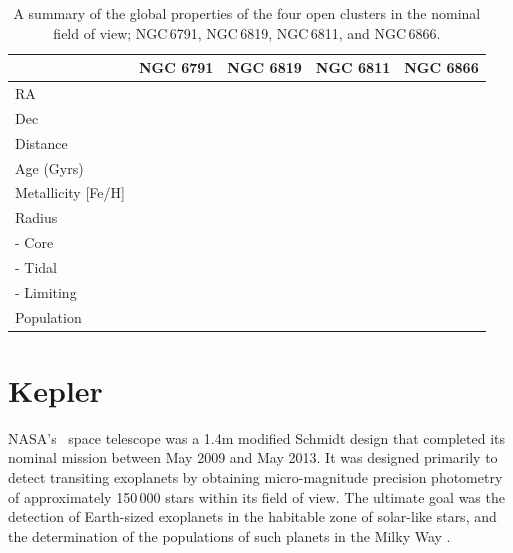 \begin{table}[h]
    \setlength\tabcolsep{10pt}
    \centering
    \begin{tabular}{lcccc}
        \hline
                        & NGC 6791 & NGC 6819 & NGC 6811 & NGC 6866 \\
        \hline
        \hline
        RA                      &  &  &  & \\
        Dec                     &  &  &  & \\
        Distance                &  &  &  & \\
        Age (Gyrs)              &  &  &  & \\
        Metallicity [Fe/H]      &  &  &  & \\
        Radius                  &  &  &  & \\
         - Core                 &  &  &  & \\
         - Tidal                &  &  &  & \\
         - Limiting             &  &  &  & \\
         Population             &  &  &  & \\
        \hline
        
    \end{tabular}
    \caption{A summary of the global properties of the four open clusters in the nominal \Kepler field of view; NGC\,6791, NGC\,6819, NGC\,6811, and NGC\,6866.}
    \label{tab:cluster_properties}
\end{table}



\section{Kepler}
NASA's \Kepler~space telescope was a 1.4m modified Schmidt design that completed its nominal mission between May 2009 and May 2013. It was designed primarily to detect transiting exoplanets by obtaining micro-magnitude precision photometry of approximately 150\,000 stars within its field of view. The ultimate goal was the detection of Earth-sized exoplanets in the habitable zone of solar-like stars, and the determination of the populations of such planets in the Milky Way \citep{koch_kepler_2010}.


